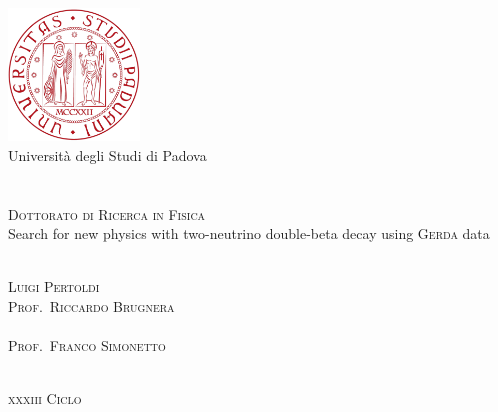 
\begin{titlepage}
  \thispagestyle{empty}
  \begin{center}
  \includegraphics[width=3.5cm]{img/unipd-logo.pdf} \\
  \vspace{0.5cm}
  {\Large Universit\`a degli Studi di Padova} \\
  \hrulefill \\
   \\
  \vspace{2cm}
  \textsc{\large Dottorato di Ricerca in Fisica} \\
  \vspace{3cm}
  \Huge{%
    Search for new physics with two-neutrino double-beta decay using \textsc{Gerda} data
  }
  \end{center}
  \vspace{3cm}
  \begin{multicols}{2}
  \large
  \noindent
   \\
  \textsc{Luigi Pertoldi}
  \columnbreak
  \flushright
   \\
  \textsc{Prof.~Riccardo Brugnera} \\
  \vspace{12mm}
   \\
  \textsc{Prof.~Franco Simonetto}
  \end{multicols}
  \vspace*{\fill}
  \begin{center}
  \hrulefill \\
  \textsc{\textsc{xxxiii} Ciclo}
  \end{center}
\end{titlepage}
\restoregeometry
